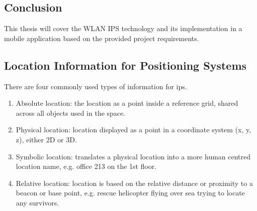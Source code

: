 \subsection{Conclusion}
This thesis will cover the WLAN IPS technology and its implementation in a mobile application based on the provided project requirements.
\subsection{Location Information for Positioning Systems}
There are four commonly used types of information for \acrshort{ips}\cite{Liu2007}.
\begin{enumerate}
\item Absolute location: the location as a point inside a reference grid, shared across all objects used in the space.
\item Physical location: location displayed as a point in a coordinate system (x, y, z), either 2D or 3D.
\item Symbolic location: translates a physical location into a more human centred location name, e.g. office 213 on the 1st floor.
\item Relative location: location is based on the relative distance or proximity to a beacon or base point, e.g. rescue helicopter flying over sea trying to locate any survivors.
\end{enumerate}